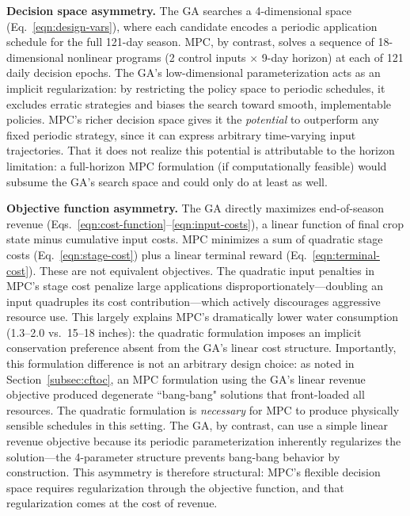 \documentclass[pdflatex,sn-mathphys-num]{sn-jnl}
\begin{document}
\textbf{Decision space asymmetry.} The GA searches a 4-dimensional space (Eq.~\ref{eqn:design-vars}), where each candidate encodes a periodic application schedule for the full 121-day season. MPC, by contrast, solves a sequence of 18-dimensional nonlinear programs (2 control inputs $\times$ 9-day horizon) at each of 121 daily decision epochs. The GA's low-dimensional parameterization acts as an implicit regularization: by restricting the policy space to periodic schedules, it excludes erratic strategies and biases the search toward smooth, implementable policies. MPC's richer decision space gives it the \emph{potential} to outperform any fixed periodic strategy, since it can express arbitrary time-varying input trajectories. That it does not realize this potential is attributable to the horizon limitation: a full-horizon MPC formulation (if computationally feasible) would subsume the GA's search space and could only do at least as well.

\textbf{Objective function asymmetry.} The GA directly maximizes end-of-season revenue (Eqs.~\ref{eqn:cost-function}--\ref{eqn:input-costs}), a linear function of final crop state minus cumulative input costs. MPC minimizes a sum of quadratic stage costs (Eq.~\ref{eqn:stage-cost}) plus a linear terminal reward (Eq.~\ref{eqn:terminal-cost}). These are not equivalent objectives. The quadratic input penalties in MPC's stage cost penalize large applications disproportionately---doubling an input quadruples its cost contribution---which actively discourages aggressive resource use. This largely explains MPC's dramatically lower water consumption (1.3--2.0 vs.\ 15--18 inches): the quadratic formulation imposes an implicit conservation preference absent from the GA's linear cost structure. Importantly, this formulation difference is not an arbitrary design choice: as noted in Section~\ref{subsec:cftoc}, an MPC formulation using the GA's linear revenue objective produced degenerate ``bang-bang" solutions that front-loaded all resources. The quadratic formulation is \emph{necessary} for MPC to produce physically sensible schedules in this setting. The GA, by contrast, can use a simple linear revenue objective because its periodic parameterization inherently regularizes the solution---the 4-parameter structure prevents bang-bang behavior by construction. This asymmetry is therefore structural: MPC's flexible decision space requires regularization through the objective function, and that regularization comes at the cost of revenue.
\end{document}
